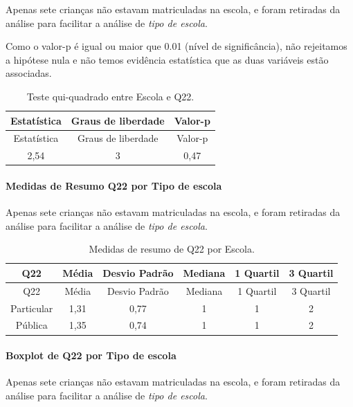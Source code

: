 \documentclass[]{article}
\let\oldparagraph\paragraph
\renewcommand{\paragraph}[1]{\oldparagraph{#1}\mbox{}}
\begin{document}
Apenas sete crianças não estavam matriculadas na escola, e foram retiradas da análise para facilitar a análise de \emph{tipo de escola}.

Como o valor-p é igual ou maior que 0.01 (nível de significância), não rejeitamos a hipótese nula e não temos evidência estatística que as duas variáveis estão associadas.

\begin{longtable}[]{@{}ccc@{}}
\caption{\label{tab:unnamed-chunk-528}Teste qui-quadrado entre Escola e Q22.}\tabularnewline
\toprule
Estatística & Graus de liberdade & Valor-p\tabularnewline
\midrule
\endfirsthead
\toprule
Estatística & Graus de liberdade & Valor-p\tabularnewline
\midrule
\endhead
2,54 & 3 & 0,47\tabularnewline
\bottomrule
\end{longtable}

\cleardoublepage

\hypertarget{medidas-de-resumo-q22-por-tipo-de-escola}{%
\paragraph{Medidas de Resumo Q22 por Tipo de escola}\label{medidas-de-resumo-q22-por-tipo-de-escola}}

Apenas sete crianças não estavam matriculadas na escola, e foram retiradas da análise para facilitar a análise de \emph{tipo de escola}.

\begin{longtable}[]{@{}cccccc@{}}
\caption{\label{tab:unnamed-chunk-529}Medidas de resumo de Q22 por Escola.}\tabularnewline
\toprule
Q22 & Média & Desvio Padrão & Mediana & 1 Quartil & 3 Quartil\tabularnewline
\midrule
\endfirsthead
\toprule
Q22 & Média & Desvio Padrão & Mediana & 1 Quartil & 3 Quartil\tabularnewline
\midrule
\endhead
Particular & 1,31 & 0,77 & 1 & 1 & 2\tabularnewline
Pública & 1,35 & 0,74 & 1 & 1 & 2\tabularnewline
\bottomrule
\end{longtable}

\hypertarget{boxplot-de-q22-por-tipo-de-escola}{%
\paragraph{Boxplot de Q22 por Tipo de escola}\label{boxplot-de-q22-por-tipo-de-escola}}

Apenas sete crianças não estavam matriculadas na escola, e foram retiradas da análise para facilitar a análise de \emph{tipo de escola}.
\end{document}

